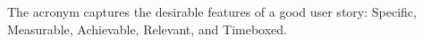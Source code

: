 The  acronym captures the desirable features of a good user story: Specific, Measurable, Achievable, Relevant, and Timeboxed.